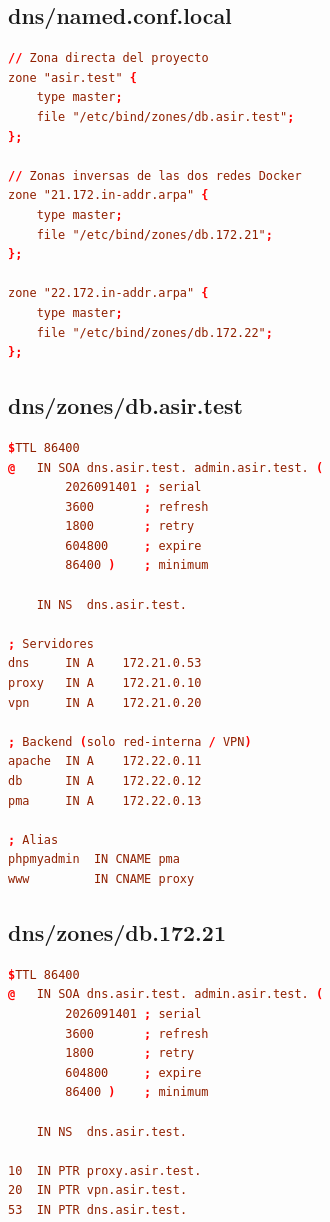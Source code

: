 \documentclass[11pt]{article}
\begin{document}
\subsection{dns/named.conf.local}
\label{sec:org000008d}

\begin{lstlisting}[language=conf,numbers=none]
// Zona directa del proyecto
zone "asir.test" {
    type master;
    file "/etc/bind/zones/db.asir.test";
};

// Zonas inversas de las dos redes Docker
zone "21.172.in-addr.arpa" {
    type master;
    file "/etc/bind/zones/db.172.21";
};

zone "22.172.in-addr.arpa" {
    type master;
    file "/etc/bind/zones/db.172.22";
};
\end{lstlisting}
\subsection{dns/zones/db.asir.test}
\label{sec:org0000090}

\begin{lstlisting}[language=conf,numbers=none]
$TTL 86400
@   IN SOA dns.asir.test. admin.asir.test. (
        2026091401 ; serial
        3600       ; refresh
        1800       ; retry
        604800     ; expire
        86400 )    ; minimum

    IN NS  dns.asir.test.

; Servidores
dns     IN A    172.21.0.53
proxy   IN A    172.21.0.10
vpn     IN A    172.21.0.20

; Backend (solo red-interna / VPN)
apache  IN A    172.22.0.11
db      IN A    172.22.0.12
pma     IN A    172.22.0.13

; Alias
phpmyadmin  IN CNAME pma
www         IN CNAME proxy
\end{lstlisting}
\subsection{dns/zones/db.172.21}
\label{sec:org0000093}

\begin{lstlisting}[language=conf,numbers=none]
$TTL 86400
@   IN SOA dns.asir.test. admin.asir.test. (
        2026091401 ; serial
        3600       ; refresh
        1800       ; retry
        604800     ; expire
        86400 )    ; minimum

    IN NS  dns.asir.test.

10  IN PTR proxy.asir.test.
20  IN PTR vpn.asir.test.
53  IN PTR dns.asir.test.
\end{lstlisting}
\end{document}
